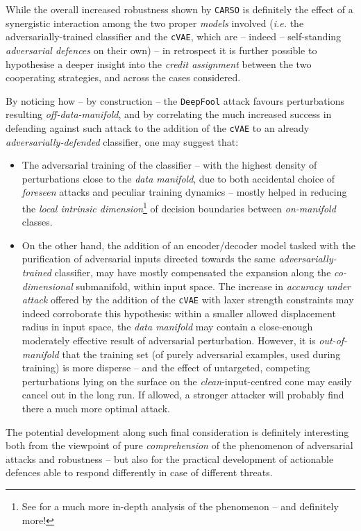 While the overall increased robustness shown by \texttt{CARSO} is definitely the effect of a synergistic interaction among the two proper \textit{models} involved (\textit{i.e.} the adversarially-trained classifier and the \texttt{cVAE}, which are -- indeed -- self-standing \textit{adversarial defences} on their own) -- in retrospect it is further possible to hypothesise a deeper insight into the \textit{credit assignment} between the two cooperating strategies, and across the cases considered.

By noticing how -- by construction -- the \texttt{DeepFool} attack favours perturbations resulting \textit{off-data-manifold}, and by correlating the much increased success in defending against such attack to the addition of the \texttt{cVAE} to an already \textit{adversarially-defended} classifier, one may suggest that:
\begin{itemize}
    \item The adversarial training of the classifier -- with the highest density of perturbations close to the \textit{data manifold}, due to both accidental choice of \textit{foreseen} attacks and peculiar training dynamics -- mostly helped in reducing the \textit{local intrinsic dimension}\footnote{See \cite{BortolussiSanguinetti2018IntrinsicGV} for a much more in-depth analysis of the phenomenon -- and definitely more!} of decision boundaries between \textit{on-manifold} classes.
    \item On the other hand, the addition of an encoder/decoder model tasked with the purification of adversarial inputs directed towards the same \textit{adversarially-trained} classifier, may have mostly compensated the expansion along the \textit{co-dimensional} submanifold, within input space. The increase in \textit{accuracy under attack} offered by the addition of the \texttt{cVAE} with laxer strength constraints  may indeed corroborate this hypothesis: within a smaller allowed displacement radius in input space, the \textit{data manifold} may contain a close-enough moderately effective result of adversarial perturbation. However, it is \textit{out-of-manifold} that the training set (of purely adversarial examples, used during training) is more disperse -- and the effect of untargeted, competing perturbations lying on the surface on the \textit{clean}-input-centred cone may easily cancel out in the long run. If allowed, a stronger attacker will probably find there a much more optimal attack.
\end{itemize}

The potential development along such final consideration is definitely interesting both from the viewpoint of pure \textit{comprehension} of the phenomenon of adversarial attacks and robustness -- but also for the practical development of actionable defences able to respond differently in case of different threats.

